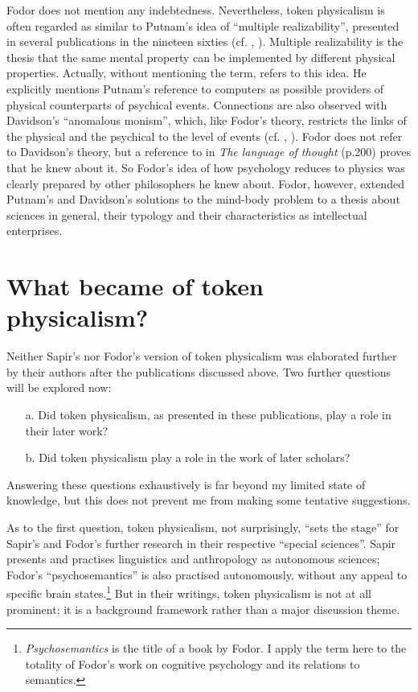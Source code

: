 \documentclass[output=paper]{langscibook}
\begin{document}
Fodor does not mention any indebtedness. Nevertheless, token physicalism is often regarded as similar to Putnam's idea of ``multiple realizability'', presented in several publications in the nineteen sixties (cf. \citealt{Putnam1960}, \citealt[xiii]{LoewerRey1991}). Multiple realizability is the thesis that the same mental property can be implemented by different physical properties. Actually, without mentioning the term, \citet[105-106]{Fodor1974} refers to this idea. He explicitly mentions Putnam's reference to computers as possible providers of physical counterparts of psychical events. Connections are also observed with Davidson's ``anomalous monism'', which, like Fodor's theory, restricts the links of the physical and the psychical to the level of events (cf. \citealt{Davidson1970}, \citealt[xxxi]{LoewerRey1991}). Fodor does not refer to Davidson's theory, but a reference to \citet{Davidson1970} in \emph{The language of thought} (p.200) proves that he knew about it. So Fodor's idea of how psychology reduces to physics was clearly prepared by other philosophers he knew about. Fodor, however, extended Putnam's and Davidson's solutions to the mind-body problem to a thesis about sciences in general, their typology and their characteristics as intellectual enterprises.

\section{What became of token physicalism?}
\label{sec:elffers:whatbecame}

Neither Sapir's nor Fodor's version of token physicalism was elaborated further by their authors after the publications discussed above. Two further questions will be explored now:

\begin{enumerate}
    \item[a.] Did token physicalism, as presented in these publications, play a role in their later work?
    \item[b.] Did token physicalism play a role in the work of later scholars?
\end{enumerate}

Answering these questions exhaustively is far beyond my limited state of knowledge, but this does not prevent me from making some tentative suggestions.

As to the first question, token physicalism, not surprisingly, ``sets the stage'' for Sapir's and Fodor's further research in their respective ``special sciences''. Sapir presents and practises linguistics and anthropology as autonomous sciences; Fodor's ``psychosemantics'' is also practised autonomously, without any appeal to specific brain states.\footnote{\emph{Psychosemantics} is the title of a \citeyear{Fodor1987} book by Fodor. I apply the term here to the totality of Fodor's work on cognitive psychology and its relations to semantics.} But in their writings, token physicalism is not at all prominent; it is a background framework rather than a major discussion theme.
\end{document}
